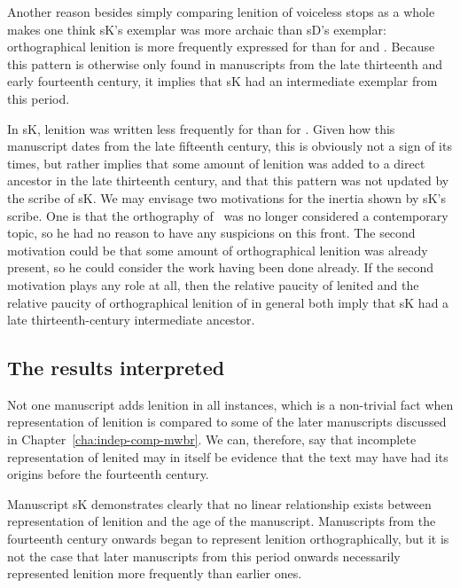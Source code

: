 Another reason besides simply comparing lenition of voiceless stops as a whole makes one think \gls{sK}'s exemplar was more archaic than \gls{sD}'s exemplar: orthographical lenition is more frequently expressed for  than for  and . Because this pattern is otherwise only found in manuscripts from the late thirteenth and early fourteenth century, it implies that \gls{sK} had an intermediate exemplar from this period.
  
In \gls{sK}, lenition was written less frequently for  than for . Given how this manuscript dates from the late fifteenth century, this is obviously not a sign of its times, but rather implies that some amount of lenition was added to a direct ancestor in the late thirteenth century, and that this pattern was not updated by the scribe of \gls{sK}. We may envisage two motivations for the inertia shown by \gls{sK}'s scribe. One is that the orthography of \lT\ was no longer considered a contemporary topic, so he had no reason to have any suspicions on this front. The second motivation could be that some amount of orthographical lenition was already present, so he could consider the work having been done already. If the second motivation plays any role at all, then the relative paucity of lenited  and the relative paucity of orthographical lenition of  in general both imply that \gls{sK} had a late thirteenth-century intermediate ancestor.

\subsection{The results interpreted}
\label{sec:interm-concl}

Not one manuscript adds lenition in all instances, which is a non-trivial fact when representation of lenition is compared to some of the later  manuscripts discussed in Chapter~\ref{cha:indep-comp-mwbr}. We can, therefore, say that incomplete representation of lenited  may in itself be evidence that the text may have had its origins before the fourteenth century.

Manuscript \gls{sK} demonstrates clearly that no linear relationship exists between representation of lenition and the age of the manuscript. Manuscripts from the fourteenth century onwards began to represent lenition orthographically, but it is not the case that later manuscripts from this period onwards necessarily represented lenition more frequently than earlier ones.
  
